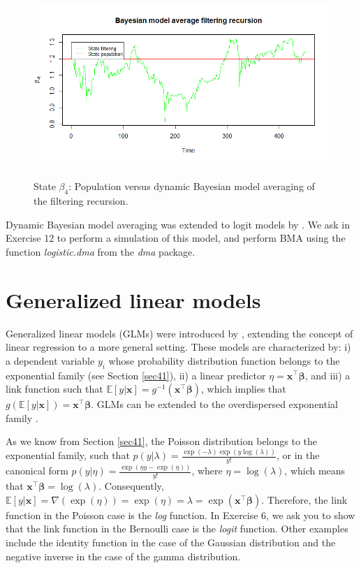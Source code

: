 \begin{figure}[!h]
	\includegraphics[width=340pt, height=200pt]{Chapters/chapter10/figures/figPMPdbma4.png}
	\caption[List of figure caption goes here]{State $\beta_{4}$: Population versus dynamic Bayesian model averaging of the filtering recursion.}\label{figPMPdbma4}
\end{figure}

Dynamic Bayesian model averaging was extended to logit models by \cite{mccormick2012dynamic}. We ask in Exercise 12 to perform a simulation of this model, and perform BMA using the function \textit{logistic.dma} from the \textit{dma} package.
     
\section{Generalized linear models}\label{sec10_3}

Generalized linear models (GLMs) were introduced by \cite{nelder1972generalized}, extending the concept of linear regression to a more general setting. These models are characterized by: i) a dependent variable $y_i$ whose probability distribution function belongs to the exponential family (see Section \ref{sec41}), ii) a linear predictor $\eta = \bm{x}^{\top}\bm{\beta}$, and iii) a link function such that $\mathbb{E}[y|\bm{x}] = g^{-1}(\bm{x}^{\top}\bm{\beta})$, which implies that $g(\mathbb{E}[y|\bm{x}]) = \bm{x}^{\top}\bm{\beta}$. GLMs can be extended to the overdispersed exponential family \cite{McCullagh1989}.

As we know from Section \ref{sec41}, the Poisson distribution belongs to the exponential family, such that $p(y|\lambda) = \frac{\exp(-\lambda)\exp(y\log(\lambda))}{y!}$, or in the canonical form $p(y|\eta) = \frac{\exp(\eta y - \exp(\eta))}{y!}$, where $\eta = \log(\lambda)$, which means that $\bm{x}^{\top}\bm{\beta} = \log(\lambda)$. Consequently, $\mathbb{E}[y|\bm{x}] = \nabla(\exp(\eta)) = \exp(\eta) = \lambda = \exp(\bm{x}^{\top}\bm{\beta})$. Therefore, the link function in the Poisson case is the \textit{log} function. In Exercise 6, we ask you to show that the link function in the Bernoulli case is the \textit{logit} function. Other examples include the identity function in the case of the Gaussian distribution and the negative inverse in the case of the gamma distribution.

